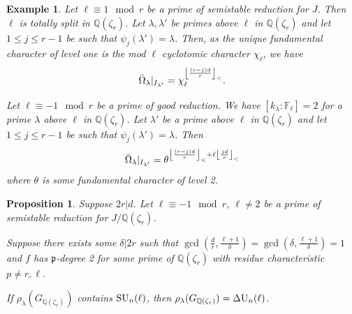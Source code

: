 \documentclass[10pt,a4paper]{amsart}
\newtheorem{example}{Example}
\newtheorem{proposition}{Proposition}
\DeclareMathOperator{\DU}{\Delta {\rm U}}
\newcommand{\Fl}{\mathbb{F}_\ell}
\newcommand{\GQr}{G_{\QQ(\zeta_{r})}}
\newcommand{\QQ}{\mathbb{Q}}
\newcommand{\Qr}{{\QQ(\zeta_r)}}
\DeclareMathOperator{\SU}{{\rm SU}}
\newcommand{\p}{\mathfrak{p}}
\begin{document}
\begin{example}
\label{inertia_at_l_for_primes_of_res_deg_1_and_2}
Let $\ell \equiv 1 \mod{r}$ be a prime of semistable reduction for $J$. Then $\ell$ is totally split in $\Qr$. Let $\lambda,\lambda'$ be primes above $\ell$ in $\Qr$ and let $1\leq j \leq r-1$ be such that $\psi_j(\lambda') = \lambda$. Then, as the unique fundamental character of level one is the mod $\ell$ cyclotomic character $\chi_\ell$, we have
$$\Bar{\Omega}_\lambda|_{I_{\lambda'}} = \chi_\ell^{\left\lfloor \frac{(r-j)d}{r}\right\rfloor_<} .$$

Let $\ell \equiv -1 \mod{r}$ be a prime of good reduction. We have $[k_\lambda:\Fl]=2$ for a prime $\lambda$ above $\ell$ in $\Qr$. Let $\lambda'$ be a prime above $\ell$ in $\Qr$ and let $1 \leq j \leq r-1$ be such that $\psi_j(\lambda') = \lambda$. Then
$$\Bar{\Omega}_\lambda|_{I_{\lambda'}} = \theta^{\left\lfloor \frac{(r-j)d}{r}\right\rfloor_< + \ell\left\lfloor \frac{jd}{r}\right\rfloor_<} $$
where $\theta$ is some fundamental character of level 2.
\end{example}

\begin{proposition}
\label{prop_DU_image}
Suppose $2r|d$. Let $\ell \equiv -1 \mod{r}$, $\ell \neq 2$ be a prime of semistable reduction for $J/\Qr$.

Suppose there exists some $\delta|2r$ such that $\gcd(\frac{d}{r},\frac{\ell+1}{\delta})= \gcd(\delta, \frac{\ell+1}{\delta})=1$ and $f$ has $\p$-degree 2 for some prime of $\Qr$ with residue characteristic $p \neq r,\ell$.

If $\rho_\lambda(\GQr)$ contains $\SU_n(\ell)$, then $\rho_\lambda(\GQr) = \DU_n(\ell)$.
\end{proposition}
\end{document}
